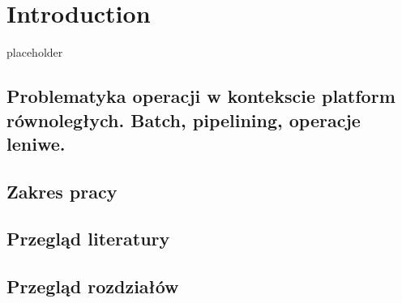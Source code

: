 \chapter{Introduction} \label{chap.introduction}
{placeholder}

\section{Problematyka operacji w kontekscie platform równoległych. Batch, pipelining, operacje leniwe.}
\section{Zakres pracy}
\section{Przegląd literatury}
\section{Przegląd rozdziałów}
